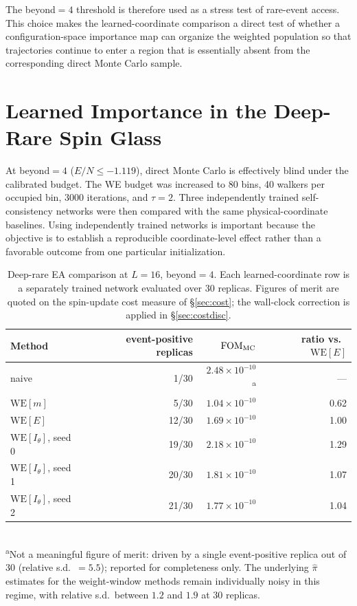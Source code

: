 \documentclass[a4paper,fleqn]{cas-sc}
\newcommand{\WE}{\mathrm{WE}}
\newcommand{\FOM}{\mathrm{FOM}}
\begin{document}
The beyond$=4$ threshold is therefore used as a stress test of rare-event access. This choice
makes the learned-coordinate comparison a direct test of whether a configuration-space
importance map can organize the weighted population so that trajectories continue to enter a
region that is essentially absent from the corresponding direct Monte Carlo sample.

\FloatBarrier

\section{Learned Importance in the Deep-Rare Spin Glass}\label{sec:deep}

At beyond$=4$ ($E/N\le-1.119$), direct Monte Carlo is effectively blind under the calibrated
budget. The WE budget was increased to 80 bins, 40 walkers per occupied bin, 3000 iterations,
and $\tau=2$. Three independently trained self-consistency networks were then compared with
the same physical-coordinate baselines. Using independently trained networks is important
because the objective is to establish a reproducible coordinate-level effect rather than a
favorable outcome from one particular initialization.

\begin{table}[H]
\centering\small
\caption{Deep-rare EA comparison at $L=16$, beyond$=4$. Each learned-coordinate row is a
separately trained network evaluated over 30 replicas. Figures of merit are quoted on the
spin-update cost measure of \S\ref{sec:cost}; the wall-clock correction is applied in
\S\ref{sec:costdisc}.}
\label{tab:deep}
\begin{tabular}{lrrr}
\toprule
Method & event-positive replicas & $\FOM_{\rm MC}$ & ratio vs.\ $\WE[E]$ \\
\midrule
naive & 1/30 & $2.48\times10^{-10}$\textsuperscript{a} & --- \\
$\WE[m]$ & 5/30 & $1.04\times10^{-10}$ & 0.62 \\
$\WE[E]$ & 12/30 & $1.69\times10^{-10}$ & 1.00 \\
$\WE[I_\theta]$, seed 0 & 19/30 & $2.18\times10^{-10}$ & 1.29 \\
$\WE[I_\theta]$, seed 1 & 20/30 & $1.81\times10^{-10}$ & 1.07 \\
$\WE[I_\theta]$, seed 2 & 21/30 & $1.77\times10^{-10}$ & 1.04 \\
\bottomrule
\end{tabular}
\\[2pt]
{\footnotesize\textsuperscript{a}Not a meaningful figure of merit: driven by a single
event-positive replica out of 30 (relative s.d.\ $=5.5$); reported for completeness only.
The underlying $\hat\pi$ estimates for the weight-window methods remain individually noisy in
this regime, with relative s.d.\ between $1.2$ and $1.9$ at 30 replicas.}
\end{table}
\end{document}
